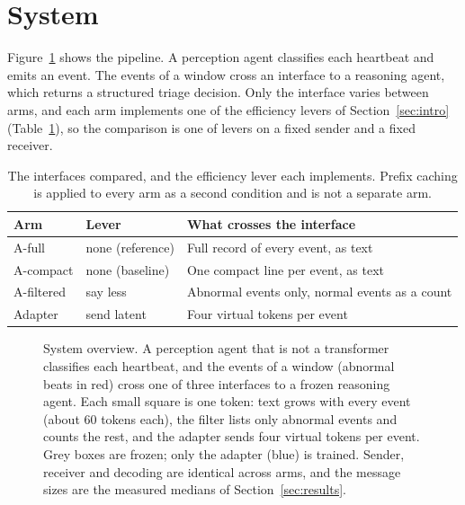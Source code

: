 \section{System}
\label{sec:system}

Figure~\ref{fig:pipeline} shows the pipeline. A perception agent classifies each heartbeat and emits an event. The events of a window cross an interface to a reasoning agent, which returns a structured triage decision. Only the interface varies between arms, and each arm implements one of the efficiency levers of Section~\ref{sec:intro} (Table~\ref{tab:levers}), so the comparison is one of levers on a fixed sender and a fixed receiver.

\begin{table}[t]
\caption{The interfaces compared, and the efficiency lever each implements. Prefix caching is applied to every arm as a second condition and is not a separate arm.}
\label{tab:levers}
\centering
\small
\begin{tabular}{lll}
\toprule
Arm & Lever & What crosses the interface \\
\midrule
A-full & none (reference) & Full record of every event, as text \\
A-compact & none (baseline) & One compact line per event, as text \\
A-filtered & say less & Abnormal events only, normal events as a count \\
Adapter & send latent & Four virtual tokens per event \\
\bottomrule
\end{tabular}
\end{table}

\begin{figure}[t]
\centering
{}
\caption{System overview. A perception agent that is not a transformer classifies each heartbeat, and the events of a window (abnormal beats in red) cross one of three interfaces to a frozen reasoning agent. Each small square is one token: text grows with every event (about 60 tokens each), the filter lists only abnormal events and counts the rest, and the adapter sends four virtual tokens per event. Grey boxes are frozen; only the adapter (blue) is trained. Sender, receiver and decoding are identical across arms, and the message sizes are the measured medians of Section~\ref{sec:results}.}
\label{fig:pipeline}
\end{figure}

